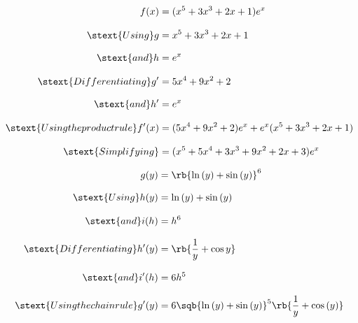 \documentclass[a4paper]{tufte-handout}
\begin{document}

\begin{question}

\qpart


\begin{align*}
  f(x) &= (x^{5} + 3x^{3} + 2x + 1)e^{x}\\[8pt]
  \stext{Using}
  g &= x^{5} + 3x^{3} + 2x + 1\\[8pt]
  \stext{and}
  h &= e^{x}\\[8pt]
  \stext{Differentiating}
  g^{\prime} &= 5x^{4} + 9x^{2} + 2\\[8pt]
  \stext{and}
  h^{\prime} &= e^{x}\\[8pt]
  \stext{Using the product rule}
  f^{\prime}(x) &= (5x^{4} + 9x^{2} + 2)e^{x} + e^{x}(x^{5} + 3x^{3} + 2x + 1)\\[8pt]
  \stext{Simplifying}
  &= (x^{5} + 5x^{4} + 3x^{3} + 9x^{2} + 2x + 3)e^{x}
\end{align*}

\vspace{5cm}

\qpart


\begin{align*}
  g(y) &= \rb{\ln{(y)} + \sin{(y)}}^{6}\\[8pt]
  \stext{Using}
  h(y) &= \ln{(y)} + \sin{(y)}\\[8pt]
  \stext{and}
  i(h) &= h^{6}\\[8pt]
  \stext{Differentiating}
  h^{\prime}(y) &= \rb{\frac{1}{y} + \cos{y}}\\[8pt]
  \stext{and}
  i^{\prime}(h) &= 6h^{5}\\[8pt]
  \stext{Using the chain rule}
  g^{\prime}(y) &= 6\sqb{\ln{(y)} + \sin{(y)}}^{5}\rb{\frac{1}{y} + \cos{(y)}}
\end{align*}

\vspace{5cm}


\end{question}
\end{document}
